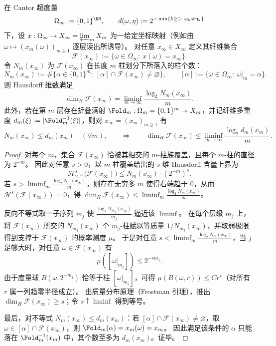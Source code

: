 \begin{theorem}\label{thm:fold-fiber-hausdorff-dimension-cylinder-count}
在 Cantor 超度量
\[
\Omega_\infty:=\{0,1\}^{\NN},\qquad
d(\omega,\eta):=2^{-\min\{k\ge 1:\ \omega_k\neq \eta_k\}}
\]
下，设 \(x:\Omega_\infty\to X_\infty=\varprojlim_m X_m\) 为一给定坐标映射（例如由 \(\omega\mapsto (x_m(\omega))_{m\ge 1}\) 逐层读出所诱导）。
对任意 \(x_\infty\in X_\infty\) 定义其纤维集合
\[
\mathcal F(x_\infty):=\{\omega\in\Omega_\infty:\ x(\omega)=x_\infty\}.
\]
令 \(N_m(x_\infty)\) 为 \(\mathcal F(x_\infty)\) 在长度 \(m\) 柱划分下所落入的柱个数：
\[
N_m(x_\infty):=\#\bigl\{\alpha\in\{0,1\}^m:\ [\alpha]\cap\mathcal F(x_\infty)\neq\varnothing\bigr\},
\qquad
[\alpha]:=\{\omega\in\Omega_\infty:\ \omega|_m=\alpha\}.
\]
则 Hausdorff 维数满足
\[
\dim_H\mathcal F(x_\infty)
=\liminf_{m\to\infty}\frac{\log_2 N_m(x_\infty)}{m}.
\]
此外，若在第 \(m\) 层存在折叠满射 \(\Fold_m:\Omega_m=\{0,1\}^m\twoheadrightarrow X_m\)，并记纤维多重度
\(
d_m(\xi):=|\Fold_m^{-1}(\xi)|
\)，则对 \(x_\infty=(x_m)_{m\ge 1}\) 有
\[
N_m(x_\infty)\le d_m(x_m)\quad(\forall m),
\qquad\Longrightarrow\qquad
\dim_H\mathcal F(x_\infty)\le \liminf_{m\to\infty}\frac{\log_2 d_m(x_m)}{m}.
\]
\end{theorem}

\begin{proof}
对每个 \(m\)，集合 \(\mathcal F(x_\infty)\) 恰被其相交的 \(m\)-柱族覆盖，且每个 \(m\)-柱的直径为 \(2^{-m}\)。
因此对任意 \(s>0\)，以 \(m\)-柱覆盖给出的 \(s\)-维 Hausdorff 含量上界为
\[
\mathcal H^s_{2^{-m}}\bigl(\mathcal F(x_\infty)\bigr)
\le
N_m(x_\infty)\cdot (2^{-m})^{s}.
\]
若 \(s>\liminf_m \frac{\log_2 N_m(x_\infty)}{m}\)，则存在无穷多 \(m\) 使得右端趋于 \(0\)，从而 \(\mathcal H^s(\mathcal F(x_\infty))=0\)，得
\(
\dim_H\mathcal F(x_\infty)\le \liminf_m \frac{\log_2 N_m(x_\infty)}{m}
\)。
\par
反向不等式取一子序列 \(m_j\) 使 \(\frac{\log_2 N_{m_j}(x_\infty)}{m_j}\) 逼近该 \(\liminf\)。
在每个层级 \(m_j\) 上，将 \(\mathcal F(x_\infty)\) 所交的 \(N_{m_j}(x_\infty)\) 个 \(m_j\)-柱赋以等质量 \(1/N_{m_j}(x_\infty)\)，并取弱极限得到支撑于 \(\mathcal F(x_\infty)\) 的概率测度 \(\mu\)。
于是对任意 \(s<\liminf_m \frac{\log_2 N_m(x_\infty)}{m}\)，当 \(j\) 足够大时，对任意 \(\omega\in\mathcal F(x_\infty)\) 有
\[
\mu([\omega|_{m_j}])\le 2^{-s m_j}.
\]
由于度量球 \(B(\omega,2^{-m_j})\) 恰等于柱 \([\omega|_{m_j}]\)，可得 \(\mu(B(\omega,r))\le C r^s\)（对所有 \(r\) 属一列趋零半径成立）。
由质量分布原理（Frostman 引理），推出 \(\dim_H\mathcal F(x_\infty)\ge s\)；令 \(s\uparrow \liminf\) 得到等号。
\par
最后，对不等式 \(N_m(x_\infty)\le d_m(x_m)\)：若 \([\alpha]\cap\mathcal F(x_\infty)\neq\varnothing\)，取 \(\omega\in[\alpha]\cap\mathcal F(x_\infty)\)，则 \(\Fold_m(\alpha)=x_m(\omega)=x_m\)。
因此满足该条件的 \(\alpha\) 只能落在 \(\Fold_m^{-1}(x_m)\) 中，其个数至多为 \(d_m(x_m)\)。证毕。
\end{proof}

\endinput
